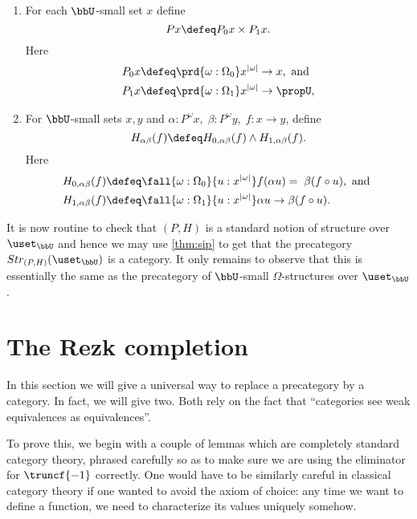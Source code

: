 \begin{defn}\label{defn:fo-notion-of-structure}
\mbox{}
\begin{enumerate}
\item For each $\bbU$-small set $x$ define
  \[ Px \defeq P_0x\times P_1x.\]
  Here
  \begin{align*}
    P_0x &\defeq \prd{\omega:\Omega_0} x^{|\omega|}\to x, \mbox{ and } \\
    P_1x &\defeq \prd{\omega:\Omega_1} x^{|\omega|}\to \propU,
  \end{align*}
\item For $\bbU$-small sets $x,y$ and
  $\alpha:P^\omega x,\;\beta:P^\omega y,\; f:x\to y$, define
  \[ H_{\alpha\beta}(f) \defeq H_{0,\alpha\beta}(f)\wedge H_{1,\alpha\beta}(f).\]
  Here
  \begin{align*}
    H_{0,\alpha\beta}(f) &\defeq
    \fall{\omega:\Omega_0}{u:x^{|\omega|}} f(\alpha u)=\;\beta(f\circ u),
    \mbox{ and }\\
    H_{1,\alpha\beta}(f) &\defeq
    \fall{\omega:\Omega_1}{u:x^{|\omega|}} \alpha u\to\beta(f\circ u).
  \end{align*}
\end{enumerate}
\end{defn}

It is now routine to check that $(P,H)$ is a standard notion of structure over $\uset_\bbU$ and hence we may use \cref{thm:sip} to get that the precategory $Str_{(P,H)}(\uset_\bbU)$ is a category.  It only remains to observe that this is essentially the same as the precategory of $\bbU$-small $\Omega$-structures over $\uset_\bbU$.


\section{The Rezk completion}
\label{sec:rezk}

In this section we will give a universal way to replace a precategory by a category.
In fact, we will give two.
Both rely on the fact that ``categories see weak equivalences as equivalences''.

To prove this, we begin with a couple of lemmas which are completely standard category theory, phrased carefully so as to make sure we are using the eliminator for $\truncf{-1}$ correctly.
One would have to be similarly careful in classical category theory if one wanted to avoid the axiom of choice: any time we want to define a function, we need to characterize its values uniquely somehow.

